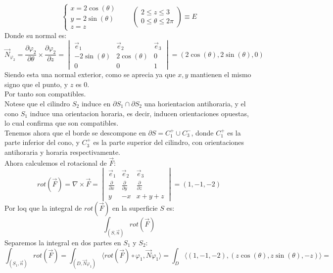 {$$\begin{cases}
        x = 2 \cos(\theta) \\
        y = 2 \sin(\theta) \\
        z = z
    \end{cases} \qquad
    \left(
        \begin{array}{ccc}
            2 \leq z \leq 3 \\
            0 \leq \theta \leq 2\pi
        \end{array}
    \right)
    \equiv E$$
    Donde su normal es:
    $$ \vec{N}_{\varphi_2} = \frac{\partial \varphi_2}{\partial \theta} \times \frac{\partial \varphi_2}{\partial z} = 
    \begin{vmatrix}
        \vec{e}_1 & \vec{e}_2 & \vec{e}_3 \\
        -2\sin(\theta) & 2\cos(\theta) & 0 \\
        0 & 0 & 1
    \end{vmatrix} = \left( 2\cos(\theta), 2\sin(\theta), 0 \right)$$
    Siendo esta una normal exterior, como se aprecia ya que $x,y$ mantienen el mismo signo que el punto, y $z$ es $0$.\\
    Por tanto son compatibles.\\
    Notese que el cilindro $S_2$ induce en $\partial S_1 \cap \partial S_2$ una horientacion antihoraria, y el cono $S_1$ induce una orientacion horaria, es decir, inducen orientaciones opuestas, lo cual confirma que son compatibles.\\
    Tenemos ahora que el borde se descompone en $\partial S = C_1^+ \cup C_3^-$, donde $C_1^+$ es la parte inferior del cono, y $C_3^+$ es la parte superior del cilindro, con orientaciones antihoraria y horaria respectivamente.\\
    Ahora calculemos el rotacional de $\vec{F}$:
    $$ rot(\vec{F}) = \nabla \times \vec{F} = \begin{vmatrix}
        \vec{e}_1 & \vec{e}_2 & \vec{e}_3 \\
        \frac{\partial}{\partial x} & \frac{\partial}{\partial y} & \frac{\partial}{\partial z} \\
        y & -x & x + y + z
    \end{vmatrix} = \left( 1, -1, -2 \right)$$
    Por loq que la integral de $rot(\vec{F})$ en la superficie $S$ es:
    $$ \int_{(S, \vec{n})} rot(\vec{F})$$
    Separemos la integral en dos partes en $S_1$ y $S_2$:
    $$ \int_{(S_1, \vec{n})} rot(\vec{F}) = \int_{(D, \vec{N}{\varphi_1})} \langle rot(\vec{F}) \circ \varphi_1, \vec{N}{\varphi_1} \rangle = \int_{D} \langle (1,-1,-2), (z\cos(\theta), z\sin(\theta), -z) \rangle =$$
}
